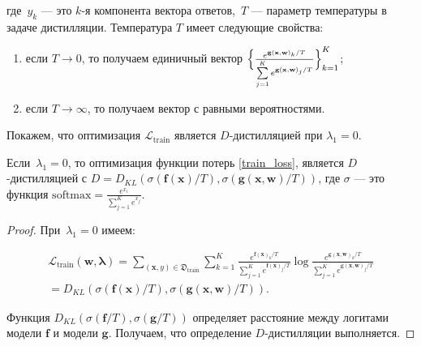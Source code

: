 \documentclass[12pt]{a&t}
\begin{document}
\noindent
где~$y_k$ --- это $k$-я компонента вектора ответов,~$T$ --- параметр температуры в задаче дистилляции. Температура $T$ имеет следующие свойства:

\begin{enumerate}
    \item если $T \rightarrow 0$, то получаем единичный вектор $\Bigl\{\frac{e^{\mathbf{g}(\mathbf{x}, \mathbf{w})_k/T}}{\sum\limits_{j=1}^{K}e^{\mathbf{g}(\mathbf{x}, \mathbf{w})_j/T}}\Bigr\}_{k=1}^K$;
    \item если $T \rightarrow \infty$, то получаем вектор с равными вероятностями.
\end{enumerate}

Покажем, что оптимизация $\mathcal{L}_\text{train}$ является $D$-дистилляцией при $\lambda_1 = 0$.

\begin{proposition}
Если~$\lambda_1 = 0$, то оптимизация функции потерь \eqref{train_loss}, является $D$-дистилляцией с $D = D_{KL}\left(\sigma\left(\mathbf{f}(\mathbf{x})/T\right), \sigma\left(\mathbf{g}(\mathbf{x}, \mathbf{w})/T\right)\right)$, где $\sigma$ --- это функция $\text{softmax} = \frac{e^{x_i}}{\sum\limits_{j=1}^Ke^{x_j}}$.
\end{proposition}

\begin{proof}
При~$\lambda_1 = 0$ имеем:

\begin{multline}
    \mathcal{L}_\text{train}(\mathbf{w}, \boldsymbol{\lambda}) = \sum\limits_{(\mathbf{x}, y) \in \mathfrak{D}_\text{train}}\sum\limits_{k=1}^{K}\frac{e^{\mathbf{f}(\mathbf{x})_k/T}}{\sum\limits_{j=1}^{K}e^{\mathbf{f}(\mathbf{x})_j/T}}\log \frac{e^{\mathbf{g}(\mathbf{x}, \mathbf{w})_k/T}}{\sum\limits_{j=1}^{K}e^{\mathbf{g}(\mathbf{x}, \mathbf{w})_j/T}} \\= D_{KL}\left(\sigma(\mathbf{f}(\mathbf{x})/T), \sigma(\mathbf{g}(\mathbf{x}, \mathbf{w})/T)\right).
    \label{train_loss}
\end{multline}

Функция $D_{KL}\left(\sigma\left(\mathbf{f}/T\right), \sigma\left(\mathbf{g}/T\right)\right)$ определяет расстояние между логитами модели $\mathbf{f}$ и модели $\mathbf{g}$. Получаем, что определение $D$-дистилляции выполняется. 

\end{proof}

\end{document}
